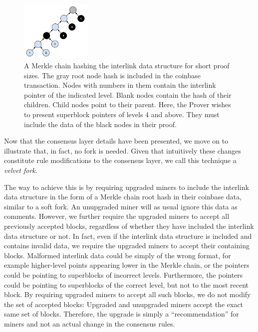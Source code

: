 \begin{figure}[h]
    \caption{\label{fig.merkle_chain}
    A Merkle chain hashing the interlink data structure for short
    proof sizes. The gray root node hash is included in the coinbase
    transaction. Nodes with numbers in them contain the interlink pointer of
    the indicated level. Blank nodes contain the hash of their children. Child
    nodes point to their parent. Here, the Prover wishes to present superblock
    pointers of levels 4 and above. They must include the data of the black
    nodes in their proof.}
    \centering
    \includegraphics[width=0.3\textwidth,keepaspectratio]{figures/merkle-chain.png}
\end{figure}

Now that the consensus layer details have been presented, we move on to
illustrate that, in fact, no fork is needed. Given that intuitively these
changes constitute rule modifications to the consensus layer, we call this
technique a \textit{velvet fork}.

The way to achieve this is by requiring upgraded miners to include the
interlink data structure in the form of a Merkle chain root hash in their
coinbase data, similar to a soft fork. An unupgraded miner will as usual ignore
this data as comments. However, we further require the upgraded miners to
accept all previously accepted blocks, regardless of whether they have included
the interlink data structure or not. In fact, even if the interlink data
structure is included and contains invalid data, we require the upgraded miners
to accept their containing blocks. Malformed interlink data could be simply of
the wrong format, for example higher-level points appearing lower in the Merkle
chain, or the pointers could be pointing to superblocks of incorrect
levels. Furthermore, the pointers could be pointing to superblocks of the
correct level, but not to the most recent block. By requiring upgraded miners
to accept all such blocks, we do not modify the set of accepted blocks:
Upgraded and unupgraded miners accept the exact same set of blocks. Therefore,
the upgrade is simply a ``recommendation'' for miners and not an actual change in
the consensus rules.

